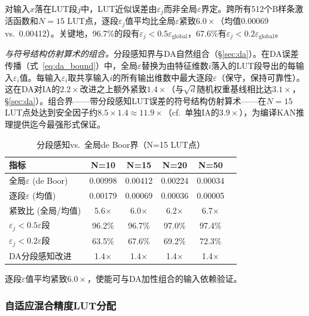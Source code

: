 \documentclass[journal,onecolumn]{IEEEtran}
\theoremstyle{definition}
\theoremstyle{plain}
\theoremstyle{remark}
\begin{document}
对输入$x$落在LUT段$j$中，LUT近似误差由$\varepsilon_j$而非全局$\varepsilon$界定。跨所有512个B样条激活函数和$N=15$ LUT点，逐段$\varepsilon_j$值平均比全局$\varepsilon$紧致$6.0\times$（均值0.00069 vs.\ 0.00412）。关键地，96.7\%的段有$\varepsilon_j < 0.5\varepsilon_{\text{global}}$，67.6\%有$\varepsilon_j < 0.2\varepsilon_{\text{global}}$。

\textit{与符号结构仿射算术的组合。}分段感知界与DA自然组合（{\S}\ref{sec:da}）。在DA误差传播（式~\ref{eq:da_bound}）中，全局$\varepsilon$替换为由特征维数$i$落入的LUT段导出的每输入$\varepsilon_i$值。每输入$\varepsilon_i$取共享输入$i$的所有输出维数中最大逐段$\varepsilon$（保守，保持可靠性）。这在DA对IA的$2.2\times$改进之上额外紧致$1.4\times$（与$\sqrt{d}$随机权重基线相比达$3.1\times$，{\S}\ref{sec:da}）。组合界——带分段感知LUT误差的符号结构仿射算术——在$N=15$ LUT点处达到安全因子约$8.5 \times 1.4 \approx 11.9\times$（cf.\ 单独IA的$3.9\times$），为编译KAN推理提供迄今最强形式保证。

\begin{table}[!t]
\centering
\caption{分段感知vs.\ 全局de Boor界（N=15 LUT点）}
\label{tab:segment_bound}
\footnotesize
\begin{tabular}{@{}lccccc@{}}
\toprule
\textbf{指标} & \textbf{N=10} & \textbf{N=15} & \textbf{N=20} & \textbf{N=50} \\
\midrule
全局$\varepsilon$ (de Boor) & 0.00998 & 0.00412 & 0.00224 & 0.00034 \\
逐段$\varepsilon$ (均值) & 0.00179 & 0.00069 & 0.00036 & 0.00005 \\
紧致比 (全局/均值) & 5.6$\times$ & 6.0$\times$ & 6.2$\times$ & 6.7$\times$ \\
$\varepsilon_j < 0.5\varepsilon$段 & 96.2\% & 96.7\% & 97.0\% & 97.4\% \\
$\varepsilon_j < 0.2\varepsilon$段 & 63.5\% & 67.6\% & 69.2\% & 72.3\% \\
DA分段感知改进 & 1.4$\times$ & 1.4$\times$ & 1.4$\times$ & 1.4$\times$ \\
\bottomrule
\end{tabular}
\vspace{1pt}
{\scriptsize 逐段$\varepsilon$值平均紧致$6.0\times$，使能可与DA加性组合的输入依赖验证。}
\end{table}

\subsubsection{自适应混合精度LUT分配}
\label{sec:adaptive-lut}
\end{document}
